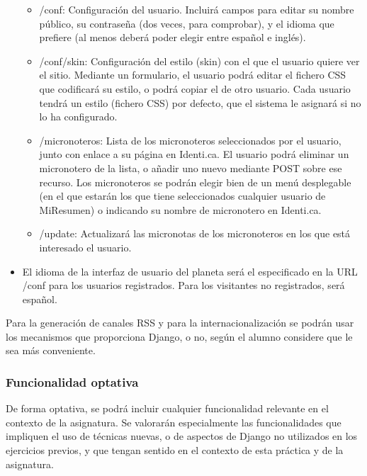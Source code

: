 \begin{itemize}
  \begin{itemize}
  \item /conf: Configuración del usuario. Incluirá campos para editar su nombre público, su contraseña (dos veces, para comprobar), y el idioma que prefiere (al menos deberá poder elegir entre español e inglés).
  \item /conf/skin: Configuración del estilo (skin) con el que el usuario quiere ver el sitio. Mediante un formulario, el usuario podrá editar el fichero CSS que codificará su estilo, o podrá copiar el de otro usuario. Cada usuario tendrá un estilo (fichero CSS) por defecto, que el sistema le asignará si no lo ha configurado.
  \item /micronoteros: Lista de los micronoteros seleccionados por el usuario, junto con enlace a su página en Identi.ca. El usuario podrá eliminar un micronotero de la lista, o añadir uno nuevo mediante POST sobre ese recurso. Los micronoteros se podrán elegir bien de un menú desplegable (en el que estarán los que tiene seleccionados cualquier usuario de MiResumen) o indicando su nombre de micronotero en Identi.ca.
  \item /update: Actualizará las micronotas de los micronoteros en los que está interesado el usuario.
  \end{itemize}

\item El idioma de la interfaz de usuario del planeta será el especificado en la URL /conf para los usuarios registrados. Para los visitantes no registrados, será español.

\end{itemize}

Para la generación de canales RSS y para la internacionalización se podrán usar los mecanismos que proporciona Django, o no, según el alumno considere que le sea más conveniente.

\subsubsection{Funcionalidad optativa}

De forma optativa, se podrá incluir cualquier funcionalidad relevante en el contexto de la asignatura. Se valorarán especialmente las funcionalidades que impliquen el uso de técnicas nuevas, o de aspectos de Django no utilizados en los ejercicios previos, y que tengan sentido en el contexto de esta práctica y de la asignatura.

